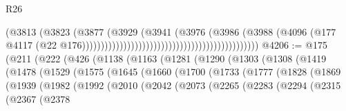 \begin{lexlean}{R26}
\begin{coremodule}
                                                                            (@3813
                                                                              (@3823
                                                                                (@3877
                                                                                  (@3929
                                                                                    (@3941
                                                                                      (@3976
                                                                                        (@3986
                                                                                          (@3988
                                                                                            (@4096
                                                                                              (@177
                                                                                                @4117
                                                                                                (@22
                                                                                                  @176)))))))))))))))))))))))))))))))))))))))))))))))
@4206 := @175
    (@211
      (@222
        (@426
          (@1138
            (@1163
              (@1281
                (@1290
                  (@1303
                    (@1308
                      (@1419
                        (@1478
                          (@1529
                            (@1575
                              (@1645
                                (@1660
                                  (@1700
                                    (@1733
                                      (@1777
                                        (@1828
                                          (@1869
                                            (@1939
                                              (@1982
                                                (@1992
                                                  (@2010
                                                    (@2042
                                                      (@2073
                                                        (@2265
                                                          (@2283
                                                            (@2294
                                                              (@2315
                                                                (@2367
                                                                  (@2378

\end{coremodule}
\end{lexlean}
